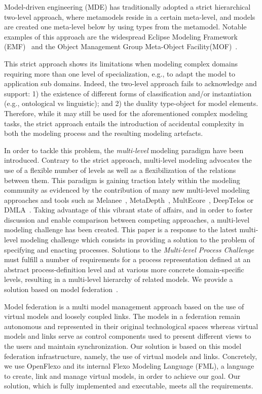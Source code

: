 Model-driven engineering (MDE) has traditionally adopted a strict hierarchical two-level approach, where metamodels reside in a certain meta-level, and models are created one meta-level below by using types from the metamodel. Notable examples of this approach are the widespread Eclipse Modeling Framework (EMF)~\citep{emf} and the Object Management Group Meta-Object Facility(MOF)~\citep{omg2013mof}.

This strict approach shows its limitations when modeling complex domains requiring more than one level of specialization, e.g., to adapt the model to application sub domains. Indeed, the two-level approach fails to acknowledge and support: 1) the existence of different forms of classification and/or instantiation (e.g., ontological vs linguistic); and 2) the duality type-object for model elements. Therefore, while it may still be used for the aforementioned complex modeling tasks, the strict approach entails the introduction of accidental complexity in both the modeling process and the resulting modeling artefacts. 

In order to tackle this problem, the \emph{multi-level} modeling paradigm have been introduced. Contrary to the strict approach, multi-level modeling advocates the use of a flexible number of levels as well as a flexibilization of the relations between them. This paradigm is gaining traction lately within the modeling community as evidenced by the contribution of many new multi-level modeling approaches and tools such as Melanee~\citep{melanee}, MetaDepth~\citep{metadepth}, MultEcore~\citep{multecore2016}, DeepTelos\citep{deeptelos2016} or DMLA~\citep{dmla2017}. Taking advantage of this vibrant state of affairs, and in order to foster discussion and enable comparison between competing approaches, a multi-level modeling challenge has been created. This paper is a response to the latest multi-level modeling challenge
which consists in providing a solution to the problem of specifying and enacting processes. Solutions to the \emph{Multi-level Process Challenge} must fulfill a number of requirements for a process representation defined at an abstract process-definition level and at various more concrete domain-specific levels, resulting in a multi-level hierarchy of related models. We provide a solution based on model federation~\citep{Golra2016-federation}.

Model federation is a multi model management approach based on the use of virtual models and loosely coupled links. The models in a federation remain autonomous and represented in their original technological spaces whereas virtual models and links serve as control components used to present different views to the users and maintain synchronization. Our solution is based on this model federation infrastructure, namely, the use of virtual models and links. Concretely, we use OpenFlexo and its internal Flexo Modeling Language (FML), a language to create, link and manage virtual models, in order to achieve our goal. Our solution, which is fully implemented and executable, meets all the requirements.

